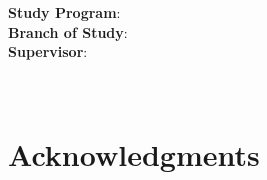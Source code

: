 \begin{minipage}{0.79\textwidth}
\begin{center}
  \Large \sc \mfuniversity \\
  \mffaculty
\end{center}
\end{minipage}
\vspace{7cm}
\begin{center}
  {\Huge \mftitle}\\
  \large \mfthesistype
\end{center}
\vspace{7cm}

\noindent
{\bf Study Program}: \mfstudyprogram\\
{\bf Branch of Study}: \mfbranchofstudy\\
{\bf Supervisor}: \mfadvisor

\vfill
\noindent
\mfplacedate \hfill {\large \mfauthor}\\
\eject

% 
% 


%
%
%
%


\ifx\draft\undefined
\chapter*{Acknowledgments}

